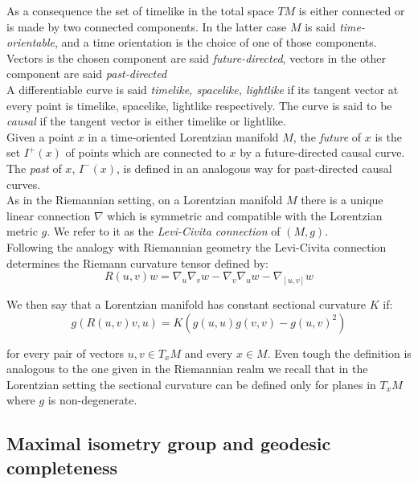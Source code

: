 As a consequence the set of timelike in the total space $TM$ is either connected or is made by two connected components. In the latter case $M$ is said \textit{time-orientable}, and a time orientation is the choice of one of those components. Vectors is the chosen component are said \textit{future-directed}, vectors in the other component are said \textit{past-directed}\\
A differentiable curve is said \textit{timelike, spacelike, lightlike} if its tangent vector at every point is timelike, spacelike, lightlike respectively. The curve is said to be \textit{causal} if the tangent vector is either timelike or lightlike. \\ Given a point $x$ in a time-oriented Lorentzian manifold $M$, the \textit{future} of $x$ is the set $I^+(x)$ of points which are connected to $x$ by a future-directed causal curve. The \textit{past} of $x$, $I^-(x)$, is defined in an analogous way for past-directed causal curves. \\As in the Riemannian setting, on a Lorentzian manifold $M$ there is a unique linear connection $\nabla$ which is symmetric and compatible with the Lorentzian metric $g$. We refer to it as the \textit{Levi-Civita connection} of $(M,g)$.\\ Following the analogy with Riemannian geometry the Levi-Civita connection determines the Riemann curvature tensor defined by: 
\[
    R(u,v)w=\nabla_u\nabla_v w-\nabla_v\nabla_u w-\nabla_{[u,v]}w
\]  

We then say that a Lorentzian manifold has constant sectional curvature $K$ if: 
\begin{equation}\label{sectionalcurvature}
    g(R(u,v)v,u)=K(g(u,u)g(v,v)-g(u,v)^2) 
\end{equation}
    


for every pair of vectors $u,v \in T_{x}M$ and every $x\in M$. Even tough the definition is analogous to the one given in the Riemannian realm we recall that in the Lorentzian setting the sectional curvature can be defined only for planes in $T_{x}M$ where $g$ is non-degenerate. 

\subsection{Maximal isometry group and geodesic completeness} 

